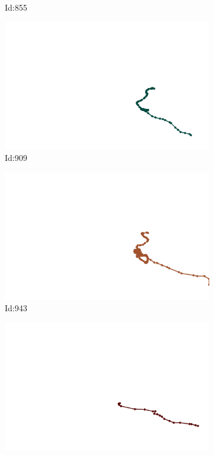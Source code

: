 \documentclass[12pt,twoside]{report}
\begin{document}
\begin{figure}
\begin{subfigure}[b]{0.20\textwidth}
\caption{Id:855}
\end{subfigure}
\begin{subfigure}[b]{0.20\textwidth}
\centering
\includegraphics[width=\textwidth]{../trajectories/909.png}
\caption{Id:909}
\end{subfigure}
\begin{subfigure}[b]{0.20\textwidth}
\centering
\includegraphics[width=\textwidth]{../trajectories/943.png}
\caption{Id:943}
\end{subfigure}
\begin{subfigure}[b]{0.20\textwidth}
\centering
\includegraphics[width=\textwidth]{../trajectories/981.png}

\end{subfigure}
\end{figure}
\end{document}

